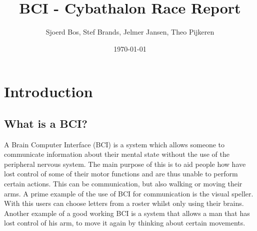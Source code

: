 \documentclass[12pt]{article}
\title{BCI - Cybathalon Race Report}
\date{\today}
\author{Sjoerd Bos, Stef Brands, Jelmer Jansen, Theo Pijkeren}
\begin{document}
\maketitle
\newpage
{}
\section{Introduction}
\subsection{What is a BCI?}
A Brain Computer Interface (BCI) is a system which allows someone to communicate information about their mental state without the use of the peripheral nervous system. The main purpose of this is to aid people how have lost control of some of their motor functions and are thus unable to perform certain actions. This can be communication, but also walking or moving their arms. A prime example of the use of BCI for communication is the visual speller. With this users can choose letters from a roster whilst only using their brains. Another example of a good working BCI is a system that allows a man that has lost control of his arm, to move it again by thinking about certain movements.
\end{document}
